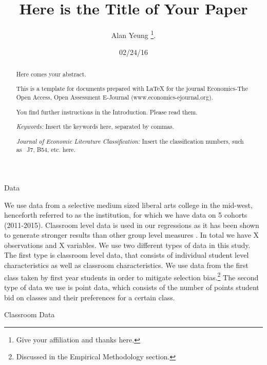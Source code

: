 \documentclass[12pt,a4paper,english,fleqn]{article}
\date{02/24/16}
\makeatletter
\renewcommand\section{\@startsection{section}{1}{\z@}
{-5ex \@plus -1ex \@minus -.2ex}{2.3ex \@plus.2ex}{\normalfont\large\bf}}
\renewcommand\subsection{\@startsection{subsection}{2}
{\z@}{-3.25ex\@plus -1ex \@minus -.2ex}{1.5ex \@plus .2ex}{\normalfont\bf}}
\makeatother
\begin{document}
\title{Here is the Title of Your Paper}


\author{Alan Yeung%
\thanks{Give your affiliation and thanks here.%
}.}
\maketitle
\begin{abstract}
\noindent Here comes your abstract.

This is a template for documents prepared with \LaTeX{} for the journal
Economics-The Open Access, Open Assessment E-Journal (www.economics-ejournal.org).

You find further instructions in the Introduction. Please read them.

\noindent \medskip{}


\noindent \emph{Keywords: }Insert the keywords here, separated by
commas.

\noindent \emph{Journal of Economic Literature Classification: }Insert
the classification numbers, such as \ J7, B54,\emph{ }etc. here\emph{.}
\end{abstract}
\newpage{}

\doublespacing

\section{Data}

We use data from a selective medium sized liberal arts college in the mid-west, henceforth referred to as the institution, for which we have data on 5 cohorts (2011-2015). Classroom level data is used in our regressions as it has been shown to generate stronger results than other group level measures \citep{burke2013classroom}. In total we have X observations and X variables. We use two different types of data in this study. The first type is classroom level data, that consists of individual student level characteristics as well as classroom characteristics. We use data from the first class taken by first year students in order to mitigate selection bias.\footnote{Discussed in the Empirical Methodology section.} The second type of data we use is point data, which consists of the number of points student bid on classes and their preferences for a certain class. 

\subsection{Classroom Data}
\end{document}
